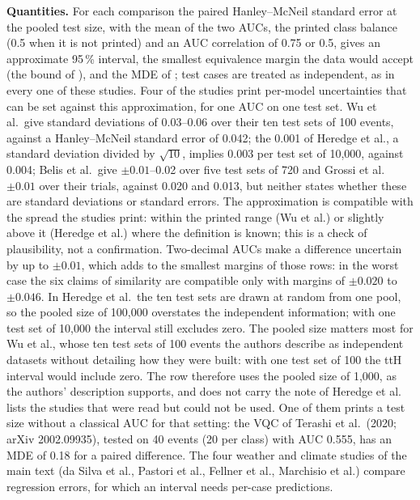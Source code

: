 \documentclass[11pt,a4paper]{article}
\begin{document}
\textbf{Quantities.} For each comparison the paired Hanley--McNeil standard error at the pooled test size, with the mean of the two AUCs, the printed class balance (0.5 when it is not printed) and an AUC correlation of 0.75 or 0.5, gives an approximate 95\,\% interval, the smallest equivalence margin the data would accept (the bound of ), and the MDE of ; test cases are treated as independent, as in every one of these studies. Four of the studies print per-model uncertainties that can be set against this approximation, for one AUC on one test set. Wu et al.\ give standard deviations of 0.03--0.06 over their ten test sets of 100 events, against a Hanley--McNeil standard error of 0.042; the 0.001 of Heredge et al., a standard deviation divided by $\sqrt{10}$, implies 0.003 per test set of 10{,}000, against 0.004; Belis et al.\ give $\pm0.01$--0.02 over five test sets of 720 and Grossi et al.\ $\pm0.01$ over their trials, against 0.020 and 0.013, but neither states whether these are standard deviations or standard errors. The approximation is compatible with the spread the studies print: within the printed range (Wu et al.) or slightly above it (Heredge et al.) where the definition is known; this is a check of plausibility, not a confirmation. Two-decimal AUCs make a difference uncertain by up to $\pm0.01$, which adds to the smallest margins of those rows: in the worst case the six claims of similarity are compatible only with margins of $\pm0.020$ to $\pm0.046$. In Heredge et al.\ the ten test sets are drawn at random from one pool, so the pooled size of 100{,}000 overstates the independent information; with one test set of 10{,}000 the interval still excludes zero. The pooled size matters most for Wu et al., whose ten test sets of 100 events the authors describe as independent datasets without detailing how they were built: with one test set of 100 the ttH interval would include zero. The row therefore uses the pooled size of 1{,}000, as the authors' description supports, and does not carry the note of Heredge et al.  lists the studies that were read but could not be used. One of them prints a test size without a classical AUC for that setting: the VQC of Terashi et al.\ (2020; arXiv 2002.09935), tested on 40 events (20 per class) with AUC 0.555, has an MDE of 0.18 for a paired difference. The four weather and climate studies of the main text (da Silva et al., Pastori et al., Fellner et al., Marchisio et al.) compare regression errors, for which an interval needs per-case predictions.
\end{document}
